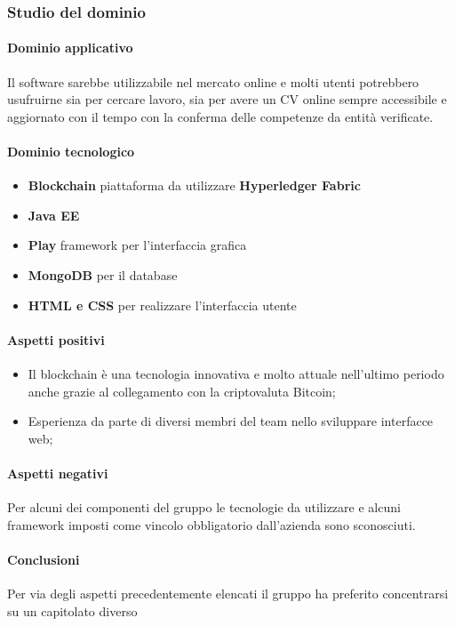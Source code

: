 	\subsubsection{Studio del dominio}
	\paragraph{Dominio applicativo} \Spazio
	Il software sarebbe utilizzabile nel mercato online e molti utenti potrebbero usufruirne sia per cercare lavoro, sia per avere un CV online sempre accessibile e aggiornato con il tempo con la conferma delle competenze da entità verificate.
	\paragraph{Dominio tecnologico} \Spazio
	\begin{itemize}
		\item \textbf{Blockchain} piattaforma da utilizzare \textbf{Hyperledger Fabric}
		\item  \textbf{Java EE}
		\item  \textbf{Play} framework per l'interfaccia grafica
		\item  \textbf{MongoDB} per il database
		\item  \textbf{HTML e CSS} per realizzare l'interfaccia utente
	\end{itemize}
	
	\paragraph{Aspetti positivi} \Spazio
	\begin{itemize}
		\item {Il blockchain è una tecnologia innovativa e molto attuale nell'ultimo periodo anche grazie al collegamento con la criptovaluta Bitcoin;}
		\item {Esperienza da parte di diversi membri del team nello sviluppare interfacce web;}
	\end{itemize} 
	\paragraph{Aspetti negativi} \Spazio
	Per alcuni dei componenti del gruppo le tecnologie da utilizzare e alcuni framework imposti come vincolo obbligatorio dall'azienda sono sconosciuti.
	\paragraph{Conclusioni} \Spazio
	Per via degli aspetti precedentemente elencati il gruppo ha preferito concentrarsi su un capitolato diverso
	
